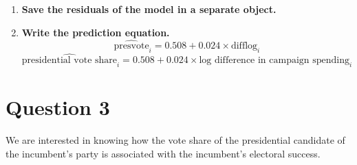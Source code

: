 \documentclass[12pt,letterpaper]{article}
\begin{document}
\begin{enumerate}
		\item \textbf{Save the residuals of the model in a separate object.}
		 		
		
		\item \textbf{Write the prediction equation.}
		{\LARGE $$ \widehat{\text{presvote}}_i = 0.508 + 0.024 \times \text{difflog}_i $$ }
		\noindent $ \widehat{\text{presidential vote share}}_i = 0.508 + 0.024 \times \text{log difference in campaign spending}_i $
		
	\end{enumerate}
		
	\newpage	
\section*{Question 3}

\noindent We are interested in knowing how the vote share of the presidential candidate of the incumbent's party is associated with the incumbent's electoral success.
\vspace{.25cm}
	
\end{document}
